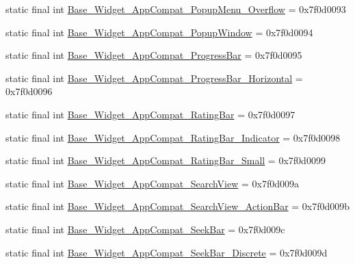\begin{DoxyCompactItemize}
static final int \mbox{\hyperlink{classandroid_1_1support_1_1v7_1_1appcompat_1_1_r_1_1style_a622b3b8e1b4687c1bb1aed07dd86ba93}{Base\+\_\+\+Widget\+\_\+\+App\+Compat\+\_\+\+Popup\+Menu\+\_\+\+Overflow}} = 0x7f0d0093
\item 
static final int \mbox{\hyperlink{classandroid_1_1support_1_1v7_1_1appcompat_1_1_r_1_1style_a9d581659ad76c3760d146bf65a6c2166}{Base\+\_\+\+Widget\+\_\+\+App\+Compat\+\_\+\+Popup\+Window}} = 0x7f0d0094
\item 
static final int \mbox{\hyperlink{classandroid_1_1support_1_1v7_1_1appcompat_1_1_r_1_1style_a23ddcd82dd90ff3db0cfbb294ced55aa}{Base\+\_\+\+Widget\+\_\+\+App\+Compat\+\_\+\+Progress\+Bar}} = 0x7f0d0095
\item 
static final int \mbox{\hyperlink{classandroid_1_1support_1_1v7_1_1appcompat_1_1_r_1_1style_ae7a6f152b019b8c804fe7dd65f1a55ed}{Base\+\_\+\+Widget\+\_\+\+App\+Compat\+\_\+\+Progress\+Bar\+\_\+\+Horizontal}} = 0x7f0d0096
\item 
static final int \mbox{\hyperlink{classandroid_1_1support_1_1v7_1_1appcompat_1_1_r_1_1style_aabdc53483e923ebf2f75d30416e7884e}{Base\+\_\+\+Widget\+\_\+\+App\+Compat\+\_\+\+Rating\+Bar}} = 0x7f0d0097
\item 
static final int \mbox{\hyperlink{classandroid_1_1support_1_1v7_1_1appcompat_1_1_r_1_1style_a74a5b00b4fe82504eddaa0878577e3c5}{Base\+\_\+\+Widget\+\_\+\+App\+Compat\+\_\+\+Rating\+Bar\+\_\+\+Indicator}} = 0x7f0d0098
\item 
static final int \mbox{\hyperlink{classandroid_1_1support_1_1v7_1_1appcompat_1_1_r_1_1style_aa145c0142507a97d6a17c35a48449292}{Base\+\_\+\+Widget\+\_\+\+App\+Compat\+\_\+\+Rating\+Bar\+\_\+\+Small}} = 0x7f0d0099
\item 
static final int \mbox{\hyperlink{classandroid_1_1support_1_1v7_1_1appcompat_1_1_r_1_1style_adf99f9c449db79c9efcec858c9d160e5}{Base\+\_\+\+Widget\+\_\+\+App\+Compat\+\_\+\+Search\+View}} = 0x7f0d009a
\item 
static final int \mbox{\hyperlink{classandroid_1_1support_1_1v7_1_1appcompat_1_1_r_1_1style_ae6ba0c44709eea91e99cd7338c24d98b}{Base\+\_\+\+Widget\+\_\+\+App\+Compat\+\_\+\+Search\+View\+\_\+\+Action\+Bar}} = 0x7f0d009b
\item 
static final int \mbox{\hyperlink{classandroid_1_1support_1_1v7_1_1appcompat_1_1_r_1_1style_a6df5305b0830c671718736249bc52921}{Base\+\_\+\+Widget\+\_\+\+App\+Compat\+\_\+\+Seek\+Bar}} = 0x7f0d009c
\item 
static final int \mbox{\hyperlink{classandroid_1_1support_1_1v7_1_1appcompat_1_1_r_1_1style_a7f43cb37b584c1458744cd714e8bd57b}{Base\+\_\+\+Widget\+\_\+\+App\+Compat\+\_\+\+Seek\+Bar\+\_\+\+Discrete}} = 0x7f0d009d

\end{DoxyCompactItemize}
